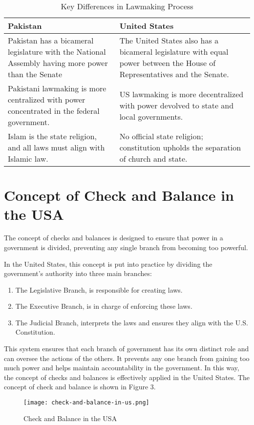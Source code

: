 \documentclass{article}
\begin{document}
\begin{table}[H]
\centering
\caption{Key Differences in Lawmaking Process}
\begin{tabularx}{\textwidth}{|X|X|}
\toprule
\textbf{Pakistan} & \textbf{United States} \\
\midrule
Pakistan has a bicameral legislature with the National Assembly having more power than the Senate & The United States also has a bicameral legislature with equal power between the House of Representatives and the Senate. \\

Pakistani lawmaking is more centralized with power concentrated in the federal government. & US lawmaking is more decentralized with power devolved to state and local governments. \\

Islam is the state religion, and all laws must align with Islamic law. & No official state religion; constitution upholds the separation of church and state. \\

\bottomrule
\end{tabularx}
\end{table}


\section{Concept of Check and Balance in the USA}
The concept of checks and balances is designed to ensure that power in a government is divided, preventing any single branch from becoming too powerful.

In the United States, this concept is put into practice by dividing the government's authority into three main branches:

\begin{enumerate}
  \item The Legislative Branch, is responsible for creating laws.
  \item The Executive Branch, is in charge of enforcing these laws.
  \item The Judicial Branch, interprets the laws and ensures they align with the U.S. Constitution.
\end{enumerate}

This system ensures that each branch of government has its own distinct role and can oversee the actions of the others. It prevents any one branch from gaining too much power and helps maintain accountability in the government. In this way, the concept of checks and balances is effectively applied in the United States.
The concept of check and balance is shown in Figure 3.
\begin{figure}
  \centering
  \texttt{[image: check-and-balance-in-us.png]}
  \caption{Check and Balance in the USA}
  \label{fig:check-and-balance-usa}
\end{figure}
\end{document}
